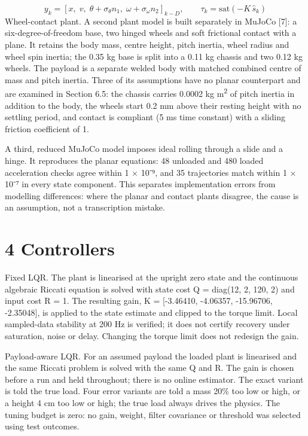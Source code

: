 \documentclass[11pt,a4paper]{article}
\begin{document}
\begin{equation}y_k=\left[x,\;v,\;\theta+\sigma_\theta n_1,\;\omega+\sigma_\omega n_2\right]_{k-D},\qquad \tau_k=\mathrm{sat}\left(-K\,\hat{s}_k\right)\end{equation}
Wheel-contact plant. A second plant model is built separately in MuJoCo [7]: a six-degree-of-freedom base, two hinged wheels and soft frictional contact with a plane. It retains the body mass, centre height, pitch inertia, wheel radius and wheel spin inertia; the 0.35 kg base is split into a 0.11 kg chassis and two 0.12 kg wheels. The payload is a separate welded body with matched combined centre of mass and pitch inertia. Three of its assumptions have no planar counterpart and are examined in Section 6.5: the chassis carries 0.0002 kg m\textsuperscript{2} of pitch inertia in addition to the body, the wheels start 0.2 mm above their resting height with no settling period, and contact is compliant (5 ms time constant) with a sliding friction coefficient of 1.

A third, reduced MuJoCo model imposes ideal rolling through a slide and a hinge. It reproduces the planar equations: 48 unloaded and 480 loaded acceleration checks agree within 1 \ensuremath{\times} 10⁻⁹, and 35 trajectories match within 1 \ensuremath{\times} 10⁻⁷ in every state component. This separates implementation errors from modelling differences: where the planar and contact plants disagree, the cause is an assumption, not a transcription mistake.

\section*{4 Controllers}
Fixed LQR. The plant is linearised at the upright zero state and the continuous algebraic Riccati equation is solved with state cost Q = diag(12, 2, 120, 2) and input cost R = 1. The resulting gain, K = [-3.46410, -4.06357, -15.96706, -2.35048], is applied to the state estimate and clipped to the torque limit. Local sampled-data stability at 200 Hz is verified; it does not certify recovery under saturation, noise or delay. Changing the torque limit does not redesign the gain.

Payload-aware LQR. For an assumed payload the loaded plant is linearised and the same Riccati problem is solved with the same Q and R. The gain is chosen before a run and held throughout; there is no online estimator. The exact variant is told the true load. Four error variants are told a mass 20\% too low or high, or a height 4 cm too low or high; the true load always drives the physics. The tuning budget is zero: no gain, weight, filter covariance or threshold was selected using test outcomes.
\end{document}
